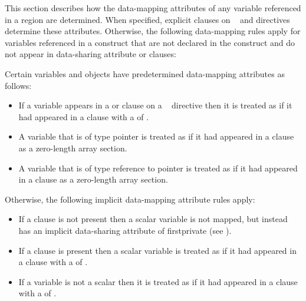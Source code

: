 {{{{%
This section describes how the data-mapping attributes of any variable 
referenced in a  region are determined. When specified, 
explicit  clauses on ~ and  
directives determine these attributes.  Otherwise, the following 
data-mapping rules apply for variables referenced in a 
construct that are not declared in the construct and do not appear in 
data-sharing attribute or  clauses:

Certain variables and objects have predetermined data-mapping attributes 
as follows:

\begin{itemize}
\item If a variable appears in a  or  clause 
on a ~ directive then it is treated as if it had appeared in a  clause with a  of .

\ccppspecificstart
\item A variable that is of type pointer is treated as if it had appeared in a  clause as a zero-length array section.
\ccppspecificend

\cppspecificstart
\item A variable that is of type reference to pointer is treated as if it had appeared in a  clause as a zero-length array section.
\cppspecificend
\end{itemize}

Otherwise, the following implicit data-mapping attribute rules apply:

\begin{itemize}
\item If a  clause is not present then 
a scalar variable is not mapped, but instead has an implicit data-sharing 
attribute of firstprivate (see 
).

\item If a  clause is present then a scalar 
variable is treated as if it had appeared in a  clause with a 
 of .

\item If a variable is not a scalar then it is treated as if it had appeared 
in a  clause with a  of .
\end{itemize}

}}}}
